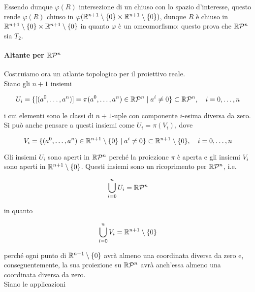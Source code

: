 Essendo dunque $ \varphi(R) $ intersezione di un chiuso con lo spazio d'interesse, questo rende $ \varphi(R) $ chiuso in $ \varphi(\mathbb{R}^{n+1} \setminus \{0\} \times \mathbb{R}^{n+1} \setminus \{0\}) $, dunque $ R $ è chiuso in $ \mathbb{R}^{n+1} \setminus \{0\} \times \mathbb{R}^{n+1} \setminus \{0\} $ in quanto $ \varphi $ è un omeomorfismo: questo prova che $ \mathbb{R}\mathcal{P}^{n} $ sia $ T_{2} $. \\

\paragraph{Altante per $ \mathbb{R}\mathcal{P}^{n} $}

Costruiamo ora un atlante topologico per il proiettivo reale. \\
Siano gli $ n+1 $ insiemi

\begin{equation}
	U_{i} = \{ [(a^{0},\dots,a^{n})] = \pi(a^{0},\dots,a^{n}) \in \rp{n} \mid a^{i} \neq 0 \} \subset \rp{n} \qcomma i=0,\dots,n
\end{equation}

i cui elementi sono le classi di $ n+1 $-uple con componente $ i $-esima diversa da zero. Si può anche pensare a questi insiemi come $ U_{i} = \pi(V_{i}) $, dove

\begin{equation}
	V_{i} = \{ (a^{0},\dots,a^{n}) \in \R^{n+1} \setminus \{0\} \mid a^{i} \neq 0 \} \subset \R^{n+1} \setminus \{0\} \qcomma i=0,\dots,n
\end{equation}

Gli insiemi $ U_{i} $ sono aperti in $ \mathbb{R}\mathcal{P}^{n} $ perché la proiezione $ \pi $ è aperta e gli insiemi $ V_{i} $ sono aperti in $ \mathbb{R}^{n+1} \setminus \{0\} $. Questi insiemi sono un ricoprimento per $ \mathbb{R}\mathcal{P}^{n} $, i.e.

\begin{equation}
	\bigcup_{i=0}^{n} U_{i} = \mathbb{R}\mathcal{P}^{n}
\end{equation}

in quanto

\begin{equation}
	\bigcup_{i=0}^{n} V_{i} = \mathbb{R}^{n+1} \setminus \{0\}
\end{equation}

perché ogni punto di $ \mathbb{R}^{n+1} \setminus \{0\} $ avrà almeno una coordinata diversa da zero e, conseguentemente, la sua proiezione su $ \mathbb{R}\mathcal{P}^{n} $ avrà anch'essa almeno una coordinata diversa da zero. \\
Siano le applicazioni

